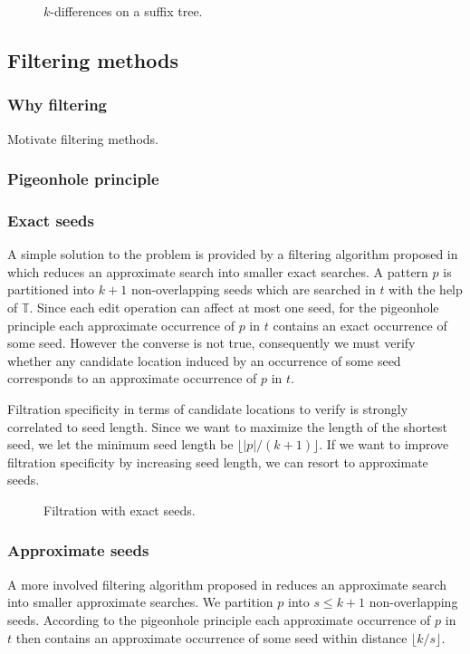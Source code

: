 \begin{figure}[h]
\caption{$k$-differences on a suffix tree.}
\label{fig:st-edit}
\end{figure}


\subsection{Filtering methods}

\subsubsection{Why filtering}

Motivate filtering methods.

\subsubsection{Pigeonhole principle}

\subsubsection{Exact seeds}
A simple solution to the problem is provided by a filtering algorithm proposed in \cite{Baeza1999b} which reduces an approximate search into smaller exact searches.
A pattern $p$ is partitioned into $k+1$ non-overlapping seeds which are searched in $t$ with the help of $\mathbb{T}$.
Since each edit operation can affect at most one seed, for the pigeonhole principle each approximate occurrence of $p$ in $t$ contains an exact occurrence of some seed.
However the converse is not true, consequently we must verify whether any candidate location induced by an occurrence of some seed corresponds to an approximate occurrence of $p$ in $t$.

Filtration specificity in terms of candidate locations to verify is strongly correlated to seed length.
Since we want to maximize the length of the shortest seed, we let the minimum seed length be $\lfloor |p|/(k+1) \rfloor$.
If we want to improve filtration specificity by increasing seed length, we can resort to approximate seeds.

\begin{figure}[h]
\caption{Filtration with exact seeds.}
\label{fig:seeds-ext}
\end{figure}

\subsubsection{Approximate seeds}
A more involved filtering algorithm proposed in \cite{Navarro2000} reduces an approximate search into smaller approximate searches.
We partition $p$ into $s \leq k+1$ non-overlapping seeds.
According to the pigeonhole principle each approximate occurrence of $p$ in $t$ then contains an approximate occurrence of some seed within distance $\lfloor k/s \rfloor$.


